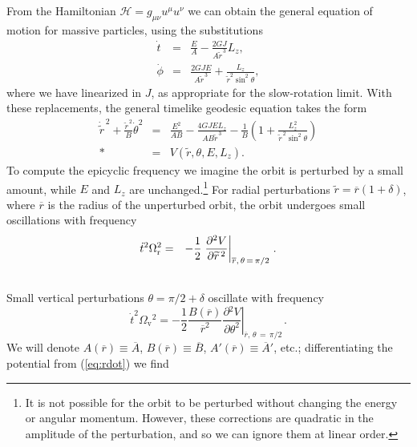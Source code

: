 \documentclass[aps,prd,amsfonts,amssymb,amsmath,nofootinbib,reprint,showpacs]{revtex4-1}
\newcommand{\eqnref}[1]{(\ref{eq:#1})}
\newcommand{\sub}[1]{\ensuremath{_\text{#1}}}
\newcommand{\partialdiff}[2]{\ensuremath{\frac{\partial {#1}}{\partial {#2}}}}
\newcommand{\recip}[1]{\ensuremath{\frac{1}{#1}}}
\begin{document}
From the Hamiltonian $\mathcal{H} = g_{\mu\nu}u^\mu u^\nu$ we can obtain the general equation of motion for massive particles, using the substitutions
\begin{eqnarray}
\dot{t} & = & \frac{E}{A} -\frac{2GJ}{A\widetilde{r}^{\,3}}L_z, \\
\dot{\phi} & = &  \frac{2GJE}{A\widetilde{r}^{\,3}} + \frac{L_z}{\widetilde{r}^2 \sin^2\theta},
\end{eqnarray}
where we have linearized in $J$, as appropriate for the slow-rotation limit. With these replacements, the general timelike geodesic equation takes the form
\begin{eqnarray}
\dot{\widetilde{r}}^{\,2} + \frac{\widetilde{r}^{\,2}}{B} \dot{\theta}^2 & = & \frac{E^2}{AB} -\frac{4GJEL_z}{AB \widetilde{r}^{\,3}}- \recip{B}\left(1 + \frac{L_z^2}{\widetilde{r}^{\,2}\sin^2\theta}\right) \nonumber \\*
 & = & V(\widetilde{r},\theta,E,L_z).
\label{eq:rdot}
\end{eqnarray}
To compute the epicyclic frequency we imagine the orbit is perturbed by a small amount, while $E$ and $L_z$ are unchanged.\footnote{It is not possible for the orbit to be perturbed without changing the energy or angular momentum. However, these corrections are quadratic in the amplitude of the perturbation, and so we can ignore them at linear order.} For radial perturbations $\widetilde{r} = \overline{r}(1 + \delta)$, where $\overline{r}$ is the radius of the unperturbed orbit, the orbit undergoes small oscillations with frequency
\begin{eqnarray}
\dot{t}^2\Omega\sub{r}^2 & = & -\recip{2} \left. \partialdiff{^2 V}{\widetilde{r}^{\,2}}\right|_{\overline{r},\,\theta\,=\,\pi/2\,}.\\
 & & \vphantom{odd} \nonumber
\end{eqnarray}
Small vertical perturbations $\theta = \pi/2 + \delta$ oscillate with frequency
\begin{equation}
\dot{t}^2\Omega\sub{v}^2 = -\recip{2} \frac{B(\overline{r})}{\overline{r}^2} \left. \partialdiff{^2 V}{\theta^2}\right|_{\overline{r},\,\theta\,=\,\pi/2\,}.
\end{equation}
We will denote $A(\overline{r}) \equiv \overline{A}$, $B(\overline{r}) \equiv \overline{B}$, $A'(\overline{r}) \equiv \overline{A}'$, etc.; differentiating the potential from \eqnref{rdot} we find
\end{document}

